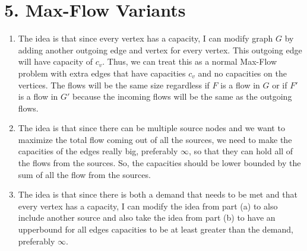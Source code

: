 \documentclass[11pt]{article}
\begin{document}
\section*{5. Max-Flow Variants}
\begin{enumerate}[label=(\alph*)]
\item
The idea is that since every vertex has a capacity, I can modify graph $G$ by adding another outgoing edge and vertex for every vertex. This outgoing edge will have capacity of $c_v$. Thus, we can treat this as a normal Max-Flow problem with extra edges that have capacities $c_v$ and no capacities on the vertices. The flows will be the same size regardless if $F$ is a flow in $G$ or if $F'$ is a flow in $G'$ because the incoming flows will be the same as the outgoing flows.



\item
The idea is that since there can be multiple source nodes and we want to maximize the total flow coming out of all the sources, we need to make the capacities of the edges really big, preferably $\infty$, so that they can hold all of the flows from the sources. So, the capacities should be lower bounded by the sum of all the flow from the sources.



\item
The idea is that since there is both a demand that needs to be met and that every vertex has a capacity, I can modify the idea from part (a) to also include another source and also take the idea from part (b) to have an upperbound for all edges capacities to be at least greater than the demand, preferably $\infty$.
\end{enumerate}
\end{document}
